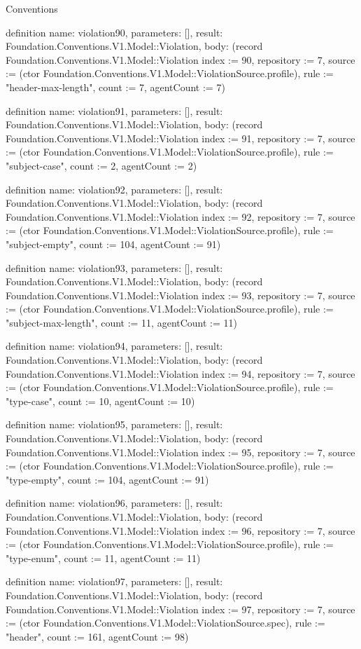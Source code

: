 \begin{lexlean}{Conventions}
\begin{semanticmodule}
definition{
  name: violation90,
  parameters: [],
  result: Foundation.Conventions.V1.Model::Violation,
  body: (record Foundation.Conventions.V1.Model::Violation {index := 90, repository := 7, source := (ctor Foundation.Conventions.V1.Model::ViolationSource.profile), rule := "header-max-length", count := 7, agentCount := 7})
}

definition{
  name: violation91,
  parameters: [],
  result: Foundation.Conventions.V1.Model::Violation,
  body: (record Foundation.Conventions.V1.Model::Violation {index := 91, repository := 7, source := (ctor Foundation.Conventions.V1.Model::ViolationSource.profile), rule := "subject-case", count := 2, agentCount := 2})
}

definition{
  name: violation92,
  parameters: [],
  result: Foundation.Conventions.V1.Model::Violation,
  body: (record Foundation.Conventions.V1.Model::Violation {index := 92, repository := 7, source := (ctor Foundation.Conventions.V1.Model::ViolationSource.profile), rule := "subject-empty", count := 104, agentCount := 91})
}

definition{
  name: violation93,
  parameters: [],
  result: Foundation.Conventions.V1.Model::Violation,
  body: (record Foundation.Conventions.V1.Model::Violation {index := 93, repository := 7, source := (ctor Foundation.Conventions.V1.Model::ViolationSource.profile), rule := "subject-max-length", count := 11, agentCount := 11})
}

definition{
  name: violation94,
  parameters: [],
  result: Foundation.Conventions.V1.Model::Violation,
  body: (record Foundation.Conventions.V1.Model::Violation {index := 94, repository := 7, source := (ctor Foundation.Conventions.V1.Model::ViolationSource.profile), rule := "type-case", count := 10, agentCount := 10})
}

definition{
  name: violation95,
  parameters: [],
  result: Foundation.Conventions.V1.Model::Violation,
  body: (record Foundation.Conventions.V1.Model::Violation {index := 95, repository := 7, source := (ctor Foundation.Conventions.V1.Model::ViolationSource.profile), rule := "type-empty", count := 104, agentCount := 91})
}

definition{
  name: violation96,
  parameters: [],
  result: Foundation.Conventions.V1.Model::Violation,
  body: (record Foundation.Conventions.V1.Model::Violation {index := 96, repository := 7, source := (ctor Foundation.Conventions.V1.Model::ViolationSource.profile), rule := "type-enum", count := 11, agentCount := 11})
}

definition{
  name: violation97,
  parameters: [],
  result: Foundation.Conventions.V1.Model::Violation,
  body: (record Foundation.Conventions.V1.Model::Violation {index := 97, repository := 7, source := (ctor Foundation.Conventions.V1.Model::ViolationSource.spec), rule := "header", count := 161, agentCount := 98})
}


\end{semanticmodule}
\end{lexlean}

